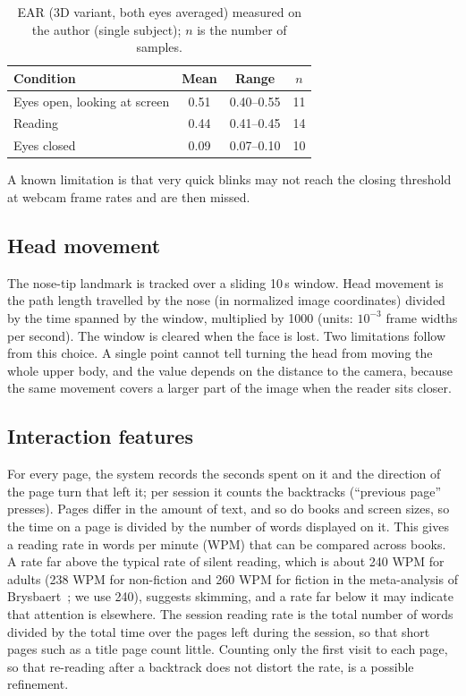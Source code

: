 \documentclass[sigconf,nonacm]{acmart}
\begin{document}
\begin{table}[t]
  \caption{EAR (3D variant, both eyes averaged) measured on the author (single subject); $n$ is the number of samples.}
  \label{tab:ear}
  \begin{tabular}{lccc}
    \toprule
    Condition & Mean & Range & $n$ \\
    \midrule
    Eyes open, looking at screen & 0.51 & 0.40--0.55 & 11 \\
    Reading & 0.44 & 0.41--0.45 & 14 \\
    Eyes closed & 0.09 & 0.07--0.10 & 10 \\
    \bottomrule
  \end{tabular}
\end{table}

A known limitation is that very quick blinks may not reach the closing threshold at webcam frame rates and are then missed.

\subsection{Head movement}
The nose-tip landmark is tracked over a sliding 10\,s window. Head movement is the path length travelled by the nose
(in normalized image coordinates) divided by the time spanned by the window, multiplied by 1000
(units: $10^{-3}$ frame widths per second). The window is cleared when the face is lost.
Two limitations follow from this choice. A single point cannot tell turning the head from moving the whole upper body,
and the value depends on the distance to the camera, because the same movement covers a larger part of the image when the
reader sits closer.

\subsection{Interaction features}
For every page, the system records the seconds spent on it and the direction of the page turn that left it; per session it
counts the backtracks (``previous page'' presses). Pages differ in the amount of text, and so do books and screen sizes,
so the time on a page is divided by the number of words displayed on it. This gives a reading rate in words per minute (WPM)
that can be compared across books. A rate far above the typical rate of silent reading, which is about 240 WPM for adults
(238 WPM for non-fiction and 260 WPM for fiction in the meta-analysis of Brysbaert~\cite{brysbaert2019words}; we use 240),
suggests skimming, and a rate far below it may indicate that attention is elsewhere.
The session reading rate is the total number of words divided by the total time over the pages left during the session, so
that short pages such as a title page count little. Counting only the first visit to each page, so that re-reading after a
backtrack does not distort the rate, is a possible refinement.
\end{document}
